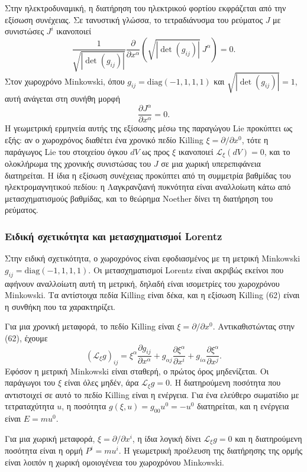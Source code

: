 \documentclass[12pt]{article}
\begin{document}
Στην ηλεκτροδυναμική, η διατήρηση του ηλεκτρικού φορτίου εκφράζεται από την εξίσωση συνέχειας. Σε τανυστική γλώσσα, το τετραδιάνυσμα του ρεύματος $J$ με συνιστώσες $J^i$ ικανοποιεί
\[
\frac{1}{\sqrt{|\det(g_{ij})|}} \frac{\partial}{\partial x^\alpha} \left( \sqrt{|\det(g_{ij})|} \ J^\alpha \right) = 0.
\]
Στον χωροχρόνο Minkowski, όπου $g_{ij} = \text{diag}(-1, 1, 1, 1)$ και $\sqrt{|\det(g_{ij})|} = 1$, αυτή ανάγεται στη συνήθη μορφή
\[
\frac{\partial J^\alpha}{\partial x^\alpha} = 0.
\]
Η γεωμετρική ερμηνεία αυτής της εξίσωσης μέσω της παραγώγου Lie προκύπτει ως εξής: αν ο χωροχρόνος διαθέτει ένα χρονικό πεδίο Killing $\xi = \partial / \partial x^0$, τότε η παράγωγος Lie του στοιχείου όγκου $dV$ ως προς $\xi$ ικανοποιεί $\mathcal{L}_\xi (dV) = 0$, και το ολοκλήρωμα της χρονικής συνιστώσας του $J$ σε μια χωρική υπερεπιφάνεια διατηρείται. Η ίδια η εξίσωση συνέχειας προκύπτει από τη συμμετρία βαθμίδας του ηλεκτρομαγνητικού πεδίου: η Λαγκρανζιανή πυκνότητα είναι αναλλοίωτη κάτω από μετασχηματισμούς βαθμίδας, και το θεώρημα Noether δίνει τη διατήρηση του ρεύματος.

\subsubsection{Ειδική σχετικότητα και μετασχηματισμοί Lorentz}

Στην ειδική σχετικότητα, ο χωροχρόνος είναι εφοδιασμένος με τη μετρική Minkowski $g_{ij} = \text{diag}(-1, 1, 1, 1)$. Οι μετασχηματισμοί Lorentz είναι ακριβώς εκείνοι που αφήνουν αναλλοίωτη αυτή τη μετρική, δηλαδή είναι ισομετρίες του χωροχρόνου Minkowski. Τα αντίστοιχα πεδία Killing είναι δέκα, και η εξίσωση Killing (62) είναι η συνθήκη που τα χαρακτηρίζει.

Για μια χρονική μεταφορά, το πεδίο Killing είναι $\xi = \partial / \partial x^0$. Αντικαθιστώντας στην (62), έχουμε
\[
(\mathcal{L}_\xi g)_{ij} = \xi^\alpha \frac{\partial g_{ij}}{\partial x^\alpha} + g_{\alpha j} \frac{\partial \xi^\alpha}{\partial x^i} + g_{i\alpha} \frac{\partial \xi^\alpha}{\partial x^j}.
\]
Εφόσον η μετρική Minkowski είναι σταθερή, ο πρώτος όρος μηδενίζεται. Οι παράγωγοι του $\xi$ είναι όλες μηδέν, άρα $\mathcal{L}_\xi g = 0$. Η διατηρούμενη ποσότητα που αντιστοιχεί σε αυτό το πεδίο Killing είναι η ενέργεια. Για ένα ελεύθερο σωματίδιο με τετραταχύτητα $u$, η ποσότητα $g(\xi, u) = g_{00} u^0 = -u^0$ διατηρείται, και η ενέργεια είναι $E = m u^0$.

Για μια χωρική μεταφορά, $\xi = \partial / \partial x^i$, η ίδια λογική δίνει $\mathcal{L}_\xi g = 0$ και η διατηρούμενη ποσότητα είναι η ορμή $P^i = m u^i$. Η γεωμετρική προέλευση της διατήρησης της ορμής είναι λοιπόν η χωρική ομοιογένεια του χωροχρόνου Minkowski.
\end{document}
